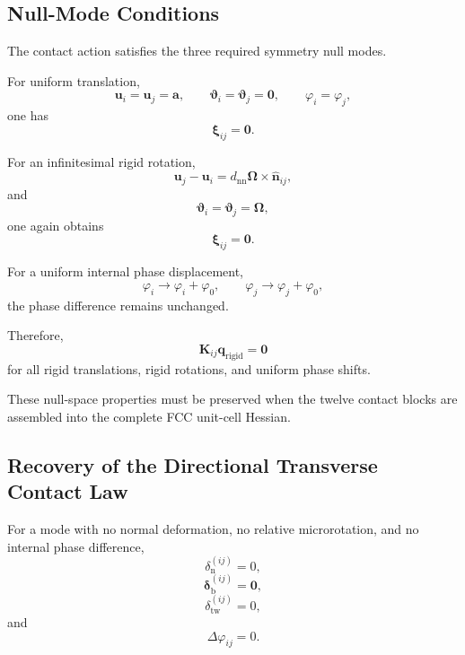 \subsection{Null-Mode Conditions}

The contact action satisfies the three required symmetry null modes.

For uniform translation,
\begin{equation}
    \mathbf{u}_i = \mathbf{u}_j = \mathbf{a}, \qquad \boldsymbol{\vartheta}_i = \boldsymbol{\vartheta}_j = \mathbf{0}, \qquad \varphi_i = \varphi_j,
\end{equation}
one has
\begin{equation}
    \boldsymbol{\xi}_{ij} = \mathbf{0}.
\end{equation}

For an infinitesimal rigid rotation,
\begin{equation}
    \mathbf{u}_j - \mathbf{u}_i = d_{\mathrm{nn}} \boldsymbol{\Omega} \times \hat{\mathbf{n}}_{ij},
\end{equation}
and
\begin{equation}
    \boldsymbol{\vartheta}_i = \boldsymbol{\vartheta}_j = \boldsymbol{\Omega},
\end{equation}
one again obtains
\begin{equation}
    \boldsymbol{\xi}_{ij} = \mathbf{0}.
\end{equation}

For a uniform internal phase displacement,
\begin{equation}
    \varphi_i \rightarrow \varphi_i + \varphi_0, \qquad \varphi_j \rightarrow \varphi_j + \varphi_0,
\end{equation}
the phase difference remains unchanged.

Therefore,
\begin{equation}
    \boxed{ \mathbf{K}_{ij} \mathbf{q}_{\mathrm{rigid}} = \mathbf{0} }
\end{equation}
for all rigid translations, rigid rotations, and uniform phase shifts.

These null-space properties must be preserved when the twelve contact blocks are assembled into the complete FCC unit-cell Hessian.

\subsection{Recovery of the Directional Transverse Contact Law}

For a mode with no normal deformation, no relative microrotation, and no internal phase difference,
\begin{equation}
    \delta_{\mathrm{n}}^{(ij)} = 0,
\end{equation}
\begin{equation}
    \boldsymbol{\delta}_{\mathrm{b}}^{(ij)} = \mathbf{0},
\end{equation}
\begin{equation}
    \delta_{\mathrm{tw}}^{(ij)} = 0,
\end{equation}
and
\begin{equation}
    \Delta\varphi_{ij} = 0.
\end{equation}

